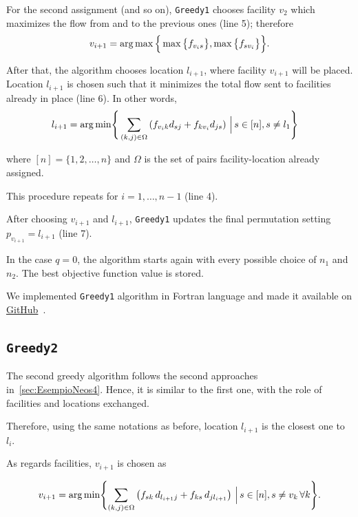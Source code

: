 For the second assignment (and so on), \texttt{Greedy1}   chooses facility  $v_2$ which maximizes the flow from and to the previous ones (line 5); therefore 
\[
v_{i+1} = \operatorname*{arg\,max} \Big\{\max\big\{f_{v_is}\big\},  \max\big\{f_{sv_i}\big\}\Big\}.
\]
 
\noindent After that,  the algorithm chooses location $l_{i+1}$, where facility $v_{i+1}$ will be placed. Location $l_{i+1}$ is chosen such that it minimizes the total flow sent to facilities already in place (line 6). In other words,
\begin{equation}
\begin{split}
l_{i+1} = \operatorname*{arg\,min}\Biggl\{\displaystyle &\sum_{(k,j)\in \Omega} \left(f_{v_i k} d_{sj}+ f_{k v_i}d_{js}\right) \, \Big| \, s \in [n], s \neq l_1  \Biggr\}
\end{split}
\end{equation}


\noindent where $[n]=\{1,2,\dots,n\}$ and $\Omega$ is the set of pairs facility-location already assigned.

This procedure repeats for $i=1,\dots, n-1$ (line 4).

After choosing $v_{i+1}$ and $l_{i+1}$, \texttt{Greedy1} updates the final permutation setting $p_{v_{i+1}}=l_{i+1}$ (line 7).


In the case $q=0$, the algorithm starts again with every possible choice of $n_1$ and $n_2$. The best objective function value is stored.


We implemented \texttt{Greedy1} algorithm in Fortran language and  made it available on \href{https://github.com/Tommaso-Mannelli-Mazzoli/QAP/blob/master/Greedy1.f90}{GitHub}~\cite{Mazzoli2020}.


\subsection{\texttt{Greedy2}}
The second greedy algorithm follows the second approaches in~\ref{sec:EsempioNeos4}. Hence, it is similar to the first one, with the role of facilities and locations exchanged. 

Therefore, using the same notations as before, location $l_{i+1}$ is the closest one to $l_i$.

As regards facilities, $v_{i+1}$ is chosen as


\[
v_{i+1} = \operatorname*{arg\,min}\Biggl\{\displaystyle \sum_{(k,j)\in \Omega} \left( f_{sk}\,d_{l_{i+1}j} +f_{ks}\,   d_{jl_{i+1}} \right)\,
\Big| \, s \in [n], s \neq v_k \, \forall k  \Biggr\}.
\]


